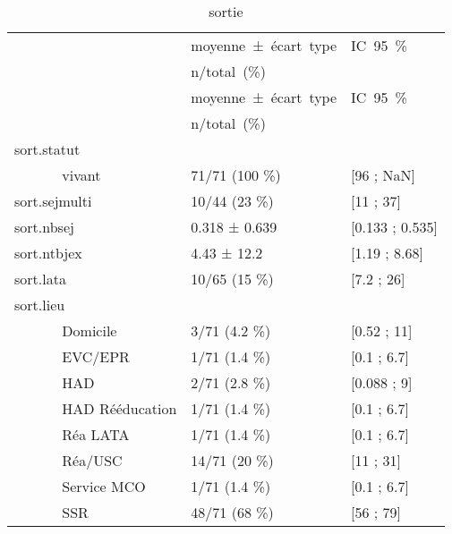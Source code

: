 \documentclass[]{article}
\begin{document}
\begin{longtable}{lll}
  \toprule
  
                                                &\mbox{moyenne ± écart type}&\mbox{IC 95 \%}\\
                                                &\mbox{n/total (\%)}&\\
                                                \midrule
                                                \endfirsthead
                                                \midrule
                                                &\mbox{moyenne ± écart type}&\mbox{IC 95 \%}\\
                                                &\mbox{n/total (\%)}&\\
                                                \midrule
                                                \endhead
                                                \bottomrule
                                                \endfoot
                                                \bottomrule
                                                \caption{sortie}
                                                \label{tabdsortie}
                                                \endlastfoot
                                                sort.statut &   &   \\ 
  ~~~~~~ vivant & 71/71 (100 \%) &  [96 ; NaN] \\ 
  sort.sejmulti & 10/44 (23 \%) &  [11 ; 37] \\ 
  sort.nbsej & 0.318 ± 0.639 & [0.133 ; 0.535] \\ 
  sort.ntbjex & 4.43 ± 12.2 & [1.19 ; 8.68] \\ 
  sort.lata & 10/65 (15 \%) &  [7.2 ; 26] \\ 
  sort.lieu &   &   \\ 
  ~~~~~~ Domicile & 3/71 (4.2 \%) &  [0.52 ; 11] \\ 
  ~~~~~~ EVC/EPR & 1/71 (1.4 \%) &  [0.1 ; 6.7] \\ 
  ~~~~~~ HAD & 2/71 (2.8 \%) &  [0.088 ; 9] \\ 
  ~~~~~~ HAD Rééducation & 1/71 (1.4 \%) &  [0.1 ; 6.7] \\ 
  ~~~~~~ Réa LATA & 1/71 (1.4 \%) &  [0.1 ; 6.7] \\ 
  ~~~~~~ Réa/USC & 14/71 (20 \%) &  [11 ; 31] \\ 
  ~~~~~~ Service MCO & 1/71 (1.4 \%) &  [0.1 ; 6.7] \\ 
  ~~~~~~ SSR & 48/71 (68 \%) &  [56 ; 79] \\ 

\end{longtable}
\end{document}
